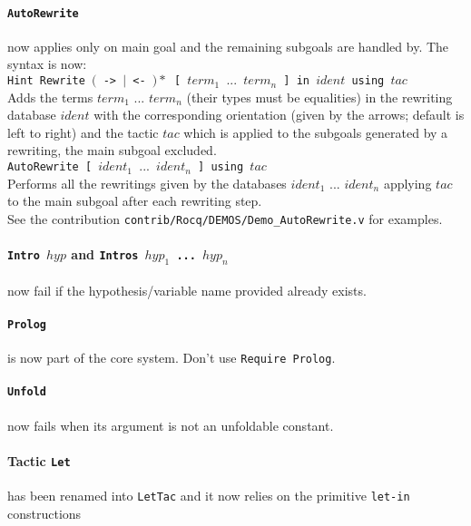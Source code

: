 \documentclass[11pt]{article}
\begin{document}
  \paragraph{{\tt AutoRewrite}} now applies only on main goal and the remaining
  subgoals are handled by. The syntax is now:\\

  {\tt Hint Rewrite $($ -> $|$ <- $)*$ [ $term_1$ $...$ $term_n$ ] in
    $ident$ using $tac$}\\

  Adds the terms $term_1$ $...$ $term_n$ (their types must be equalities) in
  the rewriting database $ident$ with the corresponding orientation (given by
  the arrows; default is left to right) and the tactic $tac$ which is applied
  to the subgoals generated by a rewriting, the main subgoal excluded.\\

  {\tt AutoRewrite  [ $ident_1$ $...$ $ident_n$ ] using $tac$}\\

  Performs all the rewritings given by the databases $ident_1$ $...$ $ident_n$
  applying $tac$ to the main subgoal after each rewriting step.\\

  See the contribution \texttt{contrib/Rocq/DEMOS/Demo\_AutoRewrite.v} for
  examples.

  \paragraph{{\tt Intro $hyp$} and {\bf \tt Intros $hyp_1$ ... $hyp_n$}}
  now fail if the hypothesis/variable name provided already exists.

  \paragraph{{\tt Prolog}} is now part of the core
  system. Don't use {\tt Require Prolog}.

  \paragraph{{\tt Unfold}} now fails when its argument is not an
  unfoldable constant.

  \paragraph{Tactic {\tt Let}} has been renamed into {\tt LetTac}
  and it now relies on the primitive {\tt let-in} constructions
\end{document}
